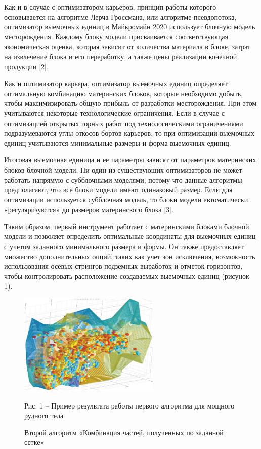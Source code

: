 \begin{multicols}{2}
Как и в случае с оптимизатором карьеров, принцип работы которого
основывается на алгоритме Лерча-Гроссмана, или алгоритме псевдопотока,
оптимизатор выемочных единиц в Майкромайн 2020 использует блочную модель
месторождения. Каждому блоку модели присваивается соответствующая
экономическая оценка, которая зависит от количества материала в блоке,
затрат на извлечение блока и его переработку, а также цены реализации
конечной продукции {[}2{]}.

Как и оптимизатор карьера, оптимизатор выемочных единиц определяет
оптимальную комбинацию материнских блоков, которые необходимо добыть,
чтобы максимизировать общую прибыль от разработки месторождения. При
этом учитываются некоторые технологические ограничения. Если в случае с
оптимизацией открытых горных работ под технологическими ограничениями
подразумеваются углы откосов бортов карьеров, то при оптимизации
выемочных единиц учитываются минимальные размеры и форма выемочных
единиц.

Итоговая выемочная единица и ее параметры зависят от параметров
материнских блоков блочной модели. Ни один из существующих оптимизаторов
не может работать напрямую с субблочными моделями, потому что данные
алгоритмы предполагают, что все блоки модели имеют одинаковый размер.
Если для оптимизации используется субблочная модель, то блоки модели
автоматически «регуляризуются» до размеров материнского блока {[}3{]}.

Таким образом, первый инструмент работает с материнскими блоками блочной
модели и позволяет определить оптимальные координаты для выемочных
единиц с учетом заданного минимального размера и формы. Он также
предоставляет множество дополнительных опций, таких как учет зон
исключения, возможность использования осевых стрингов подземных
выработок и отметок горизонтов, чтобы контролировать расположение
создаваемых выемочных единиц (рисунок 1).
\end{multicols}

\begin{figure}[H]
	\centering
	\includegraphics[width=0.6\textwidth]{assets/1250}
	\caption*{Рис. 1 -- Пример результата работы первого алгоритма для мощного рудного тела}
	\caption*{Второй алгоритм «Комбинация частей, полученных по заданной сетке»}
\end{figure}

